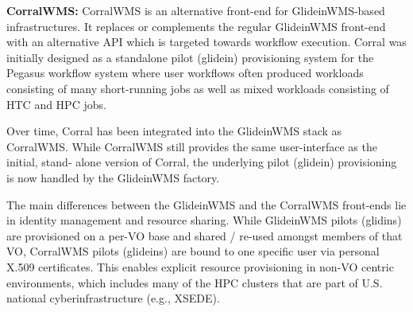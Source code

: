 \documentclass{sig-alternate}
\begin{document}
\textbf{CorralWMS:} CorralWMS is an alternative front-end for GlideinWMS-based
infrastructures. It replaces or complements the regular GlideinWMS front-end
with an alternative API which is targeted towards workflow execution. Corral was
initially designed as a standalone pilot (glidein) provisioning system for
the Pegasus workflow system where user  workflows often produced workloads
consisting of many short-running jobs as well as mixed workloads consisting of
HTC and HPC jobs.

Over time, Corral has been integrated into the GlideinWMS stack as CorralWMS.
While CorralWMS still provides the same user-interface as the initial, stand-
alone version of Corral, the underlying pilot (glidein) provisioning is
now handled by the GlideinWMS factory.

The main differences between the GlideinWMS and the CorralWMS front-ends lie in
identity management and resource sharing. While GlideinWMS pilots (glidins) are
provisioned on a per-VO base and shared / re-used amongst members of that VO,
CorralWMS pilots (glideins) are bound to one specific user via personal  X.509
certificates. This enables explicit resource provisioning in non-VO centric
environments, which includes many of the HPC clusters that are part of U.S.
national cyberinfrastructure (e.g., XSEDE).


%

\end{document}
